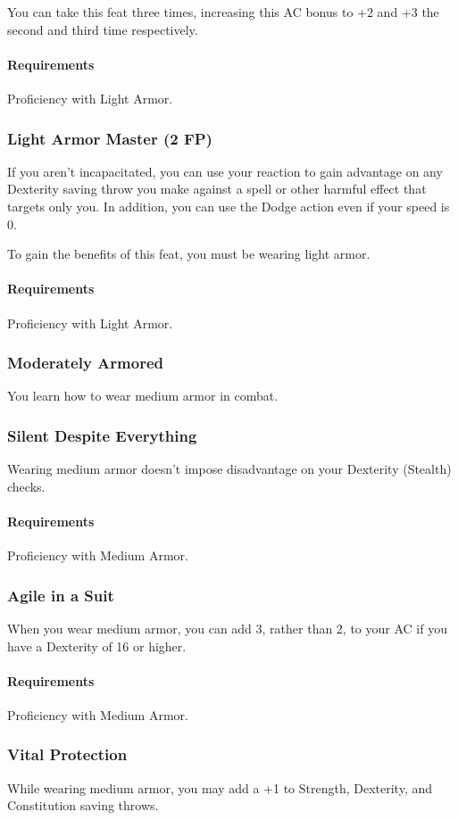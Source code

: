     You can take this feat three times, increasing this AC bonus to +2 and +3 the second and third time respectively.
    \paragraph{Requirements} Proficiency with Light Armor.
\subsubsection{Light Armor Master (2 FP)} \label{feat::lightarmormaster}
    If you aren't incapacitated, you can use your reaction to gain advantage on any Dexterity saving throw you make against a spell or other harmful effect that targets only you.
    In addition, you can use the Dodge action even if your speed is 0.

    To gain the benefits of this feat, you must be wearing light armor.
    \paragraph{Requirements} Proficiency with Light Armor.
\subsubsection{Moderately Armored} \label{feat::moderatelyarmored}
    You learn how to wear medium armor in combat.
\subsubsection{Silent Despite Everything} \label{feat::silentdespiteeverything}
    Wearing medium armor doesn't impose disadvantage on your Dexterity (Stealth) checks.
    \paragraph{Requirements} Proficiency with Medium Armor.
\subsubsection{Agile in a Suit} \label{feat::agileinasuit}
    When you wear medium armor, you can add 3, rather than 2, to your AC if you have a Dexterity of 16 or higher.
    \paragraph{Requirements} Proficiency with Medium Armor.
\subsubsection{Vital Protection} \label{feat::vitalprotection}
    While wearing medium armor, you may add a +1 to Strength, Dexterity, and Constitution saving throws.

